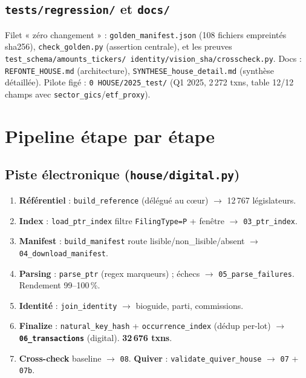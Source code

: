 \documentclass[11pt,a4paper]{article}
\begin{document}
\subsection{\texttt{tests/regression/} et \texttt{docs/}}
Filet « zéro changement » : \texttt{golden\_manifest.json} (108 fichiers empreintés sha256),
\texttt{check\_golden.py} (assertion centrale), et les preuves \texttt{test\_schema/amounts\_tickers/
identity/vision\_sha/crosscheck.py}. Docs : \texttt{REFONTE\_HOUSE.md} (architecture),
\texttt{SYNTHESE\_house\_detail.md} (synthèse détaillée). Pilote figé : \texttt{0 HOUSE/2025\_test/}
(Q1 2025, 2\,272 txns, table 12/12 champs avec \texttt{sector\_gics}/\texttt{etf\_proxy}).

\section{Pipeline étape par étape}
\subsection{Piste électronique (\texttt{house/digital.py})}
\begin{enumerate}[nosep,leftmargin=1.5em]
\item \textbf{Référentiel} : \texttt{build\_reference} (délégué au cœur) $\rightarrow$ 12\,767 législateurs.
\item \textbf{Index} : \texttt{load\_ptr\_index} filtre \texttt{FilingType=P} + fenêtre $\rightarrow$ \texttt{03\_ptr\_index}.
\item \textbf{Manifest} : \texttt{build\_manifest} route lisible/non\_lisible/absent $\rightarrow$ \texttt{04\_download\_manifest}.
\item \textbf{Parsing} : \texttt{parse\_ptr} (regex marqueurs) ; échecs $\rightarrow$ \texttt{05\_parse\_failures}. Rendement 99--100\,\%.
\item \textbf{Identité} : \texttt{join\_identity} $\rightarrow$ bioguide, parti, commissions.
\item \textbf{Finalize} : \texttt{natural\_key\_hash} + \texttt{occurrence\_index} (dédup per-lot) $\rightarrow$ \textbf{\texttt{06\_transactions}} (digital). \textbf{32\,676 txns}.
\item \textbf{Cross-check} baseline $\rightarrow$ \texttt{08}. \textbf{Quiver} : \texttt{validate\_quiver\_house} $\rightarrow$ \texttt{07} + \texttt{07b}.
\end{enumerate}
\end{document}
